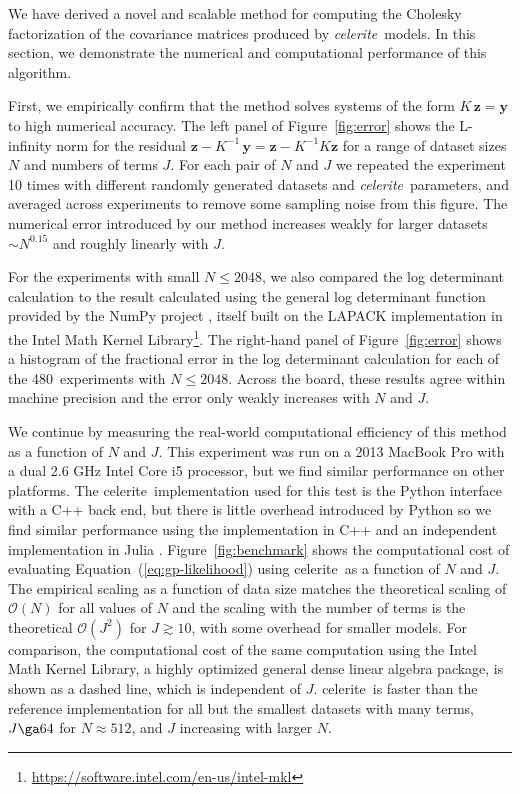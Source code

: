 \documentclass[manuscript, letterpaper]{aastex6}
\makeatletter
\let\origsubsection\subsection
\renewcommand\subsection{\@ifstar{\starsubsection}{\nostarsubsection}}
\newcommand\nostarsubsection[1]{\subsectionprelude\origsubsection{#1}}
\newcommand\starsubsection[1]{\subsectionprelude\origsubsection*{#1}}
\newcommand\subsectionprelude{\vspace{1em}}
\newcommand{\project}[1]{\textsf{#1}}
\newcommand{\celerite}{\project{celerite}}
\newcommand{\celeriteterm}{\emph{celerite}}
\newcommand{\figureref}[1]{\ref{fig:#1}}
\newcommand{\Figure}[1]{Figure~\figureref{#1}}
\renewcommand{\eqref}[1]{\ref{eq:#1}}
\newcommand{\Eq}[1]{Equation~(\eqref{#1})}
\newcommand{\eq}[1]{\Eq{#1}}
\newcommand{\bvec}[1]{{\ensuremath{\boldsymbol{#1}}}}
\makeatother
\begin{document}
\subsection{Performance}

We have derived a novel and scalable method for computing the Cholesky
factorization of the covariance matrices produced by \celeriteterm\ models.
In this section, we demonstrate the numerical and computational performance of
this algorithm.

First, we empirically confirm that the method solves systems of the form
$K\,\bvec{z} = \bvec{y}$ to high numerical accuracy.
The left panel of \Figure{error} shows the L-infinity norm for the residual
$\bvec{z} - K^{-1}\,\bvec{y} = \bvec{z}-K^{-1}K\bvec{z}$ for a range of dataset sizes $N$ and numbers of terms $J$.
For each pair of $N$ and $J$ we repeated the experiment 10 times with
different randomly generated datasets and \celeriteterm\ parameters, and
averaged across experiments to remove some sampling noise from this figure.
The numerical error introduced by our method increases weakly for larger
datasets $\sim N^{0.15}$ and roughly linearly with $J$.

For the experiments with small $N \le 2048$, we also compared the log
determinant calculation to the result calculated using the general log
determinant function provided by the \project{NumPy} project
\citep{Van-Der-Walt:2011}, itself built on the \project{LAPACK}
\citep{Anderson:1999} implementation in the Intel Math Kernel
Library\footnote{\url{https://software.intel.com/en-us/intel-mkl}}.
The right-hand panel of \Figure{error} shows a histogram of the fractional
error in the log determinant calculation for each of the 480~experiments with
$N \le 2048$.
Across the board, these results agree within machine precision and the error
only weakly increases with $N$ and $J$.

We continue by measuring the real-world computational efficiency of this
method as a function of $N$ and $J$.
This experiment was run on a 2013 MacBook Pro with a dual 2.6 GHz Intel Core
i5 processor, but we find similar performance on other platforms.
The \celerite\ implementation used for this test is the \project{Python}
interface with a \project{C++} back end, but there is little overhead
introduced by \project{Python} so we find similar performance using
the implementation in \project{C++} and an independent implementation in
\project{Julia} \citep{Bezanzon:2012}.
\Figure{benchmark} shows the computational cost of evaluating
\eq{gp-likelihood} using \celerite\ as a function of $N$ and $J$.
The empirical scaling as a function of data size matches the theoretical
scaling of $\mathcal{O}(N)$ for all values of $N$ and the scaling with the
number of terms is the theoretical $\mathcal{O}(J^2)$ for $J \gtrsim 10$, with
some overhead for smaller models.
For comparison, the computational cost of the same computation using the Intel
Math Kernel Library, a highly optimized general dense linear algebra package,
is shown as a dashed line, which is independent of $J$.
\celerite\ is faster than the reference implementation for all but the
smallest datasets with many terms, $J \ga 64$ for $N\approx 512$,
and $J$ increasing with larger $N$.
\end{document}
